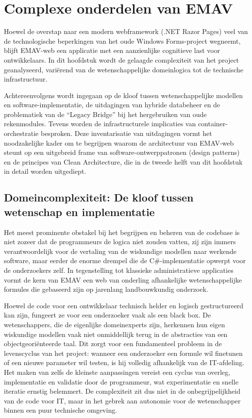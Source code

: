 \chapter{Complexe onderdelen van EMAV}
\label{ch:projectcomplexiteit}

Hoewel de overstap naar een modern webframework (.NET Razor Pages) veel van de technologische beperkingen van het oude Windows Forms-project wegneemt, blijft EMAV-web een applicatie met een aanzienlijke cognitieve last voor ontwikkelaars. In dit hoofdstuk wordt de gelaagde complexiteit van het project geanalyseerd, variërend van de wetenschappelijke domeinlogica tot de technische infrastructuur.

Achtereenvolgens wordt ingegaan op de kloof tussen wetenschappelijke modellen en software-implementatie, de uitdagingen van hybride databeheer en de problematiek van de ``Legacy Bridge'' bij het hergebruiken van oude rekenmodules. Tevens worden de infrastructurele implicaties van container-orchestratie besproken. Deze inventarisatie van uitdagingen vormt het noodzakelijke kader om te begrijpen waarom de architectuur van EMAV-web steunt op een uitgebreid frame van software-ontwerppatronen (design patterns) en de principes van Clean Architecture, die in de tweede helft van dit hoofdstuk in detail worden uitgediept.

\section{Domeincomplexiteit: De kloof tussen wetenschap en implementatie}
Het meest prominente obstakel bij het begrijpen en beheren van de codebase is niet zozeer dat de programmeurs de logica niet zouden vatten, zij zijn immers verantwoordelijk voor de vertaling van de wiskundige modellen naar werkende software, maar eerder de enorme drempel die de C\#-implementatie opwerpt voor de onderzoekers zelf.
In tegenstelling tot klassieke administratieve applicaties vormt de kern van EMAV een web van onderling afhankelijke wetenschappelijke formules die gebaseerd zijn op jarenlang landbouwkundig onderzoek.

Hoewel de code voor een ontwikkelaar technisch helder en logisch gestructureerd kan zijn, fungeert ze voor een onderzoeker vaak als een black box. De wetenschappers, die de eigenlijke domeinexperts zijn, herkennen hun eigen wiskundige modellen vaak niet onmiddellijk terug in de abstracties van een objectgeoriënteerde taal. Dit zorgt voor een fundamenteel probleem in de levenscyclus van het project: wanneer een onderzoeker een formule wil finetunen of een nieuwe parameter wil testen, is hij volledig afhankelijk van de IT-afdeling. Het maken van zelfs de kleinste aanpassingen vereist een cyclus van overleg, implementatie en validatie door de programmeur, wat experimentatie en snelle iteratie ernstig belemmert. De complexiteit zit dus niet in de onbegrijpelijkheid van de code voor IT, maar in het gebrek aan autonomie voor de wetenschapper binnen een puur technische omgeving.

